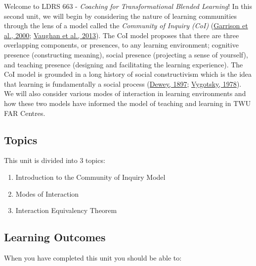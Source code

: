 \documentclass[
]{book}
\providecommand{\tightlist}{%
  \setlength{\itemsep}{0pt}\setlength{\parskip}{0pt}}
\begin{document}
Welcome to LDRS 663 - \emph{Coaching for Transformational Blended Learning}! In this second unit, we will begin by considering the nature of learning communities through the lens of a model called the \emph{Community of Inquiry (CoI)} (\href{https://www.sciencedirect.com/science/article/pii/S1096751600000166?}{Garrison et al., 2000}; \href{http://www.aupress.ca/index.php/books/120229}{Vaughan et al., 2013}). The CoI model proposes that there are three overlapping components, or presences, to any learning environment; cognitive presence (constructing meaning), social presence (projecting a sense of yourself), and teaching presence (designing and facilitating the learning experience). The CoI model is grounded in a long history of social constructivism which is the idea that learning is fundamentally a social process (\href{https://en.wikisource.org/wiki/My_Pedagogic_Creed}{Dewey, 1897}; \href{https://twu.idm.oclc.org/login?url=http://search.ebscohost.com/login.aspx?direct=true\&db=cat05965a\&AN=alc.191437\&site=eds-live}{Vygotsky, 1978}). We will also consider various modes of interaction in learning environments and how these two models have informed the model of teaching and learning in TWU FAR Centres.

\hypertarget{topics-1}{%
\subsection*{Topics}\label{topics-1}}

This unit is divided into 3 topics:

\begin{enumerate}
\def\labelenumi{\arabic{enumi}.}
\tightlist
\item
  Introduction to the Community of Inquiry Model\\
\item
  Modes of Interaction\\
\item
  Interaction Equivalency Theorem
\end{enumerate}

\hypertarget{learning-outcomes}{%
\subsection*{Learning Outcomes}\label{learning-outcomes}}

When you have completed this unit you should be able to:
\end{document}
